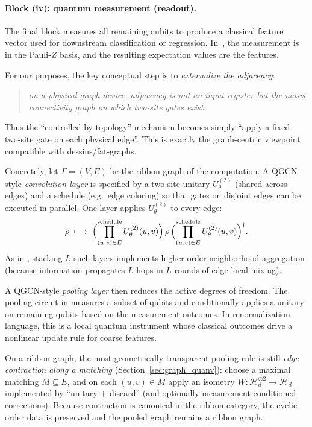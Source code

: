 \documentclass[11pt,oneside]{amsbook}
\numberwithin{equation}{section}
\theoremstyle{plain}
\theoremstyle{definition}
\theoremstyle{remark}
\begin{document}
\paragraph{Block (iv): quantum measurement (readout).}
The final block measures all remaining qubits to produce a classical feature vector used for downstream
classification or regression.  In~\cite{Zheng2021QGCN}, the measurement is in the Pauli-$Z$ basis, and the
resulting expectation values are the features.

\medskip
For our purposes, the key conceptual step is to \emph{externalize the adjacency}:
\begin{quote}
\emph{on a physical graph device, adjacency is not an input register but the native connectivity graph on which two-site gates exist.}
\end{quote}
Thus the ``controlled-by-topology'' mechanism becomes simply ``apply a fixed two-site gate on each physical edge''.
This is exactly the graph-centric viewpoint compatible with dessins/fat-graphs.

Concretely, let $\Gamma=(V,E)$ be the ribbon graph of the computation.
A QGCN-style \emph{convolution layer} is specified by a two-site unitary $U_{\theta}^{(2)}$ (shared across edges) and a schedule
(e.g.\ edge coloring) so that gates on disjoint edges can be executed in parallel.
One layer applies $U_{\theta}^{(2)}$ to every edge:
\begin{equation}
  \rho \;\longmapsto\; \Bigl(\prod_{(u,v)\in E}^{\mathrm{schedule}} U_{\theta}^{(2)}(u,v)\Bigr)\,\rho\,
  \Bigl(\prod_{(u,v)\in E}^{\mathrm{schedule}} U_{\theta}^{(2)}(u,v)\Bigr)^\dagger.
  \label{eq:qgcn_edge_layer}
\end{equation}
As in \cite{Zheng2021QGCN}, stacking $L$ such layers implements higher-order neighborhood aggregation
(because information propagates $L$ hops in $L$ rounds of edge-local mixing).

A QGCN-style \emph{pooling layer} then reduces the active degrees of freedom.
The pooling circuit in \cite{Zheng2021QGCN} measures a subset of qubits and conditionally applies a unitary on remaining qubits
based on the measurement outcomes.  In renormalization language, this is a local quantum instrument whose classical outcomes
drive a nonlinear update rule for coarse features.

On a ribbon graph, the most geometrically transparent pooling rule is still \emph{edge contraction along a matching}
(Section~\ref{sec:graph_quanv}): choose a maximal matching $M\subseteq E$, and on each $(u,v)\in M$ apply an isometry
$W:\mathcal{H}_d^{\otimes 2}\to\mathcal{H}_d$ implemented by ``unitary + discard'' (and optionally measurement-conditioned
corrections).
Because contraction is canonical in the ribbon category, the cyclic order data is preserved and the pooled graph remains a ribbon graph.
\end{document}
